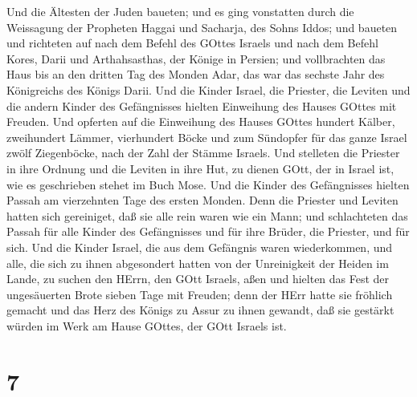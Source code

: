  Und die Ältesten der Juden baueten; und es ging vonstatten
durch die Weissagung der Propheten Haggai und Sacharja, des Sohns Iddos;
und baueten und richteten auf nach dem Befehl des GOttes Israels und
nach dem Befehl Kores, Darii und Arthahsasthas, der Könige in Persien;
 und vollbrachten das Haus bis an den dritten Tag des
Monden Adar, das war das sechste Jahr des Königreichs des Königs Darii.
 Und die Kinder Israel, die Priester, die Leviten und die
andern Kinder des Gefängnisses hielten Einweihung des Hauses GOttes mit
Freuden.  Und opferten auf die Einweihung des Hauses GOttes
hundert Kälber, zweihundert Lämmer, vierhundert Böcke und zum Sündopfer
für das ganze Israel zwölf Ziegenböcke, nach der Zahl der Stämme
Israels.  Und stelleten die Priester in ihre Ordnung und
die Leviten in ihre Hut, zu dienen GOtt, der in Israel ist, wie es
geschrieben stehet im Buch Mose.  Und die Kinder des
Gefängnisses hielten Passah am vierzehnten Tage des ersten Monden.
 Denn die Priester und Leviten hatten sich gereiniget, daß
sie alle rein waren wie ein Mann; und schlachteten das Passah für alle
Kinder des Gefängnisses und für ihre Brüder, die Priester, und für sich.
 Und die Kinder Israel, die aus dem Gefängnis waren
wiederkommen, und alle, die sich zu ihnen abgesondert hatten von der
Unreinigkeit der Heiden im Lande, zu suchen den HErrn, den GOtt Israels,
aßen  und hielten das Fest der ungesäuerten Brote sieben
Tage mit Freuden; denn der HErr hatte sie fröhlich gemacht und das Herz
des Königs zu Assur zu ihnen gewandt, daß sie gestärkt würden im Werk am
Hause GOttes, der GOtt Israels ist.

\hypertarget{section-6}{%
\section{7}\label{section-6}}

